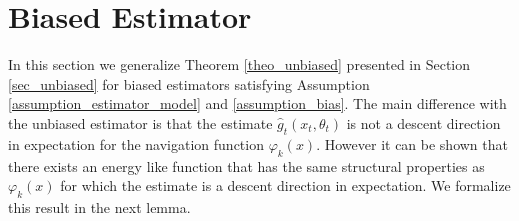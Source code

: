 \documentclass[article]{IEEEtran}
\newtheorem{lemma}{Lemma}
\theoremstyle{definition}
\begin{document}
\section{Biased Estimator}\label{sec_biased}
%
In this section we generalize Theorem \ref{theo_unbiased} presented in Section \ref{sec_unbiased} for biased estimators satisfying Assumption \ref{assumption_estimator_model} and \ref{assumption_bias}. The main difference with the unbiased estimator is that the estimate $\hat{g}_t(x_t,\theta_t)$ is not a descent direction in expectation for the navigation function $\varphi_k(x)$. However it can be shown that there exists an energy like function that has the same structural properties as $\varphi_k(x)$ for which the estimate is a descent direction in expectation. We formalize this result in the next lemma. 
%
%
%
\end{document}
